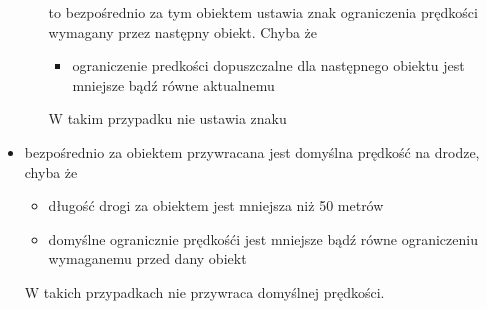 \begin{itemize}
\begin{itemize}
to bezpośrednio za tym obiektem ustawia znak ograniczenia prędkości wymagany przez następny obiekt. Chyba że
\begin{itemize}
\item ograniczenie predkości dopuszczalne dla następnego obiektu jest mniejsze bądź równe aktualnemu
\end{itemize}
W takim przypadku nie ustawia znaku
\end{itemize}
\item bezpośrednio za obiektem przywracana jest domyślna prędkość na drodze, chyba że 
\begin{itemize}
\item długość drogi za obiektem jest mniejsza niż 50 metrów
\item domyślne ogranicznie prędkośći jest mniejsze bądź równe ograniczeniu wymaganemu przed dany obiekt
\end{itemize}
W takich przypadkach nie przywraca domyślnej prędkości.
\end{itemize}



